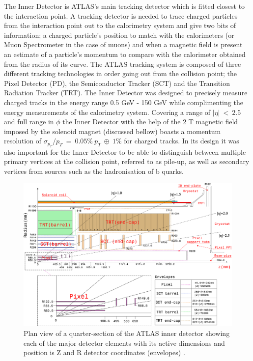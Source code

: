 		The Inner Detector is ATLAS's main tracking detector which is fitted closest to the interaction point. A tracking detector is needed to trace charged particles from the interaction point out to the calorimetry system and give two bits of information; a charged particle's position to match with the calorimeters (or Muon Spectrometer in the case of muons) and when a magnetic field is present an estimate of a particle's momentum to compare with the calorimeter obtained from the radius of its curve. The  ATLAS tracking system is composed of three different tracking technologies in order going out from the collision point; the Pixel Detector (PD), the Semiconductor Tracker (SCT) and the Transition Radiation Tracker (TRT). The Inner Detector was designed to precisely measure charged tracks in the energy range 0.5 GeV - 150 GeV while complimenting the energy measurements of the calorimetry system. Covering a range of $|\eta|~<~2.5$ and full range in $\phi$ the Inner Detector with the help of the 2 T magnetic field imposed by the solenoid magnet (discussed bellow) boasts a momentum resolution of $\sigma_{p_{T}}/p_{T}~=~0.05\%~p_{T}~\oplus~1\%$ for charged tracks. In its design it was also important for the Inner Detector to be able to distinguish between multiple primary vertices at the collision point, referred to as pile-up, as well as secondary vertices from sources such as the hadronisation of b quarks. 

		\begin{figure}[h]
			\begin{center}
				\includegraphics[scale=0.3]{images/FigID26-mod-011107.eps}
			\end{center}
			\caption{Plan view of a quarter-section of the ATLAS inner detector showing each of the major detector elements with its active dimensions and position is Z and R detector coordinates (envelopes) \cite{Aad:1129811}.}
			\label{fig:ATLAS_inner_config}
		\end{figure}




